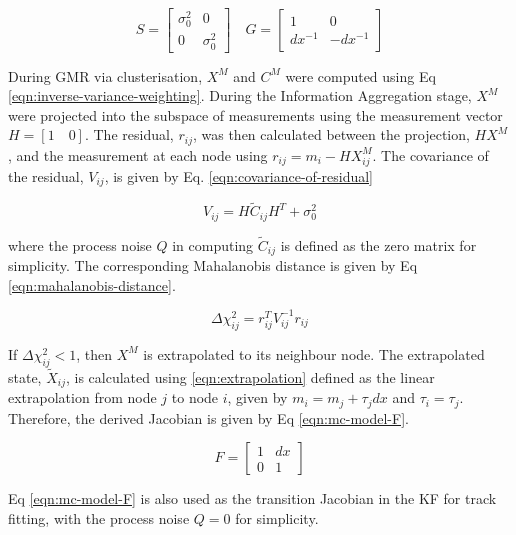 \begin{equation}
S = \begin{bmatrix} \sigma_0^{2} & 0 \\ 0 & \sigma_0^{2} \end{bmatrix}  \quad G = \begin{bmatrix} 1 & 0 \\ dx^{-1} & -dx^{-1}  \end{bmatrix}
\label{eqn:track-state-estimate-2}
\end{equation}


During GMR via clusterisation, $X^{M}$ and $C^{M}$ were computed using Eq \eqref{eqn:inverse-variance-weighting}. During the Information Aggregation stage, $X^M$ were projected into the subspace of measurements using the measurement vector $H = [1 \quad 0]$. The residual, $r_{ij}$, was then calculated between the projection, $HX^M$, and the measurement at each node using $r_{ij} = m_i - HX_{ij}^M$. The covariance of the residual, $V_{ij}$, is given by Eq. \eqref{eqn:covariance-of-residual}

\begin{equation}
{V}_{ij} = H \widetilde{C}_{ij} H^{T} + \sigma_{0}^{2}
\label{eqn:covariance-of-residual}
\end{equation}

where the process noise $Q$ in computing $\widetilde{C}_{ij}$ is defined as the zero matrix for simplicity. The corresponding Mahalanobis distance is given by Eq \eqref{eqn:mahalanobis-distance}.

\begin{equation}
\Delta \chi_{ij}^{2} = r_{ij}^{T} {V}_{ij}^{-1} r_{ij}
\label{eqn:mahalanobis-distance}
\end{equation}

If $\Delta \chi_{ij}^{2} < 1$, then $X^M$ is extrapolated to its neighbour node. The extrapolated state, $\widetilde{X}_{ij}$, is calculated using \eqref{eqn:extrapolation} defined as the linear extrapolation from node $j$ to node $i$, given by $m_i = m_j + \tau_j dx$ and $\tau_i = \tau_j$. Therefore, the derived Jacobian is given by Eq \eqref{eqn:mc-model-F}.

\begin{equation}
F = \begin{bmatrix} 1 & dx \\ 0 & 1 \end{bmatrix}
\label{eqn:mc-model-F}
\end{equation}


Eq \eqref{eqn:mc-model-F} is also used as the transition Jacobian in the KF for track fitting, with the process noise $Q = 0$ for simplicity.

